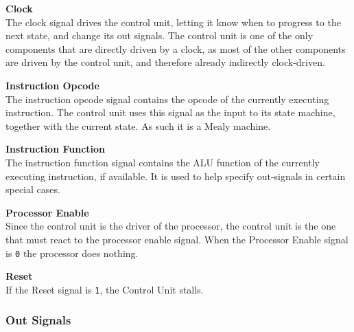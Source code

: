 \begin{description}
\item{\textbf{Clock}} \\
The clock signal drives the control unit, letting it know when to progress to the next state, and change its out signals.
The control unit is one of the only components that are directly driven by a clock, as most of the other components are driven by the control unit, and therefore already indirectly clock-driven.

\item{\textbf{Instruction Opcode}} \\
The instruction opcode signal contains the opcode of the currently executing instruction.
The control unit uses this signal as the input to its state machine, together with the current state.
As such it is a Mealy machine.

\item{\textbf{Instruction Function}} \\
The instruction function signal contains the ALU function of the currently executing instruction, if available.
It is used to help specify out-signals in certain special cases.

\item{\textbf{Processor Enable}} \\
Since the control unit is the driver of the processor, the control unit is the one that must react to the processor enable signal.
When the Processor Enable signal is \texttt{0} the processor does nothing.

\item{\textbf{Reset}} \\
If the Reset signal is \texttt{1}, the Control Unit stalls.

\end{description}

\subsubsection{Out Signals}

